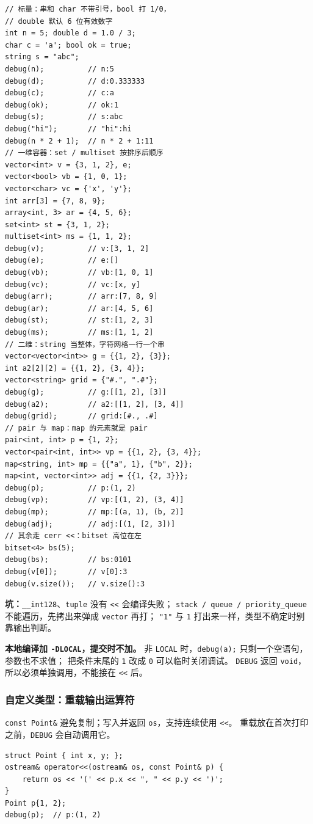 	\begin{verbatim}
// 标量：串和 char 不带引号，bool 打 1/0，
// double 默认 6 位有效数字
int n = 5; double d = 1.0 / 3;
char c = 'a'; bool ok = true;
string s = "abc";
debug(n);          // n:5
debug(d);          // d:0.333333
debug(c);          // c:a
debug(ok);         // ok:1
debug(s);          // s:abc
debug("hi");       // "hi":hi
debug(n * 2 + 1);  // n * 2 + 1:11
// 一维容器：set / multiset 按排序后顺序
vector<int> v = {3, 1, 2}, e;
vector<bool> vb = {1, 0, 1};
vector<char> vc = {'x', 'y'};
int arr[3] = {7, 8, 9};
array<int, 3> ar = {4, 5, 6};
set<int> st = {3, 1, 2};
multiset<int> ms = {1, 1, 2};
debug(v);          // v:[3, 1, 2]
debug(e);          // e:[]
debug(vb);         // vb:[1, 0, 1]
debug(vc);         // vc:[x, y]
debug(arr);        // arr:[7, 8, 9]
debug(ar);         // ar:[4, 5, 6]
debug(st);         // st:[1, 2, 3]
debug(ms);         // ms:[1, 1, 2]
// 二维：string 当整体，字符网格一行一个串
vector<vector<int>> g = {{1, 2}, {3}};
int a2[2][2] = {{1, 2}, {3, 4}};
vector<string> grid = {"#.", ".#"};
debug(g);          // g:[[1, 2], [3]]
debug(a2);         // a2:[[1, 2], [3, 4]]
debug(grid);       // grid:[#., .#]
// pair 与 map：map 的元素就是 pair
pair<int, int> p = {1, 2};
vector<pair<int, int>> vp = {{1, 2}, {3, 4}};
map<string, int> mp = {{"a", 1}, {"b", 2}};
map<int, vector<int>> adj = {{1, {2, 3}}};
debug(p);          // p:(1, 2)
debug(vp);         // vp:[(1, 2), (3, 4)]
debug(mp);         // mp:[(a, 1), (b, 2)]
debug(adj);        // adj:[(1, [2, 3])]
// 其余走 cerr <<：bitset 高位在左
bitset<4> bs(5);
debug(bs);         // bs:0101
debug(v[0]);       // v[0]:3
debug(v.size());   // v.size():3
	\end{verbatim}

	\textbf{坑：}\texttt{\_\_int128}、\texttt{tuple} 没有 \texttt{<<} 会编译失败；
	\texttt{stack / queue / priority\_queue} 不能遍历，先拷出来弹成 \texttt{vector} 再打；
	\texttt{"1"} 与 \texttt{1} 打出来一样，类型不确定时别靠输出判断。

	\textbf{本地编译加 \texttt{-DLOCAL}，提交时不加。}
	非 \texttt{LOCAL} 时，\texttt{debug(a);} 只剩一个空语句，参数也不求值；
	把条件末尾的 \texttt{1} 改成 \texttt{0} 可以临时关闭调试。
	\texttt{DEBUG} 返回 \texttt{void}，所以必须单独调用，不能接在 \texttt{<<} 后。

	\subsubsection{自定义类型：重载输出运算符}

	\texttt{const Point\&} 避免复制；写入并返回 \texttt{os}，支持连续使用 \texttt{<<}。
	重载放在首次打印之前，\texttt{DEBUG} 会自动调用它。

	\begin{verbatim}
struct Point { int x, y; };
ostream& operator<<(ostream& os, const Point& p) {
    return os << '(' << p.x << ", " << p.y << ')';
}
Point p{1, 2};
debug(p);  // p:(1, 2)
	\end{verbatim}

